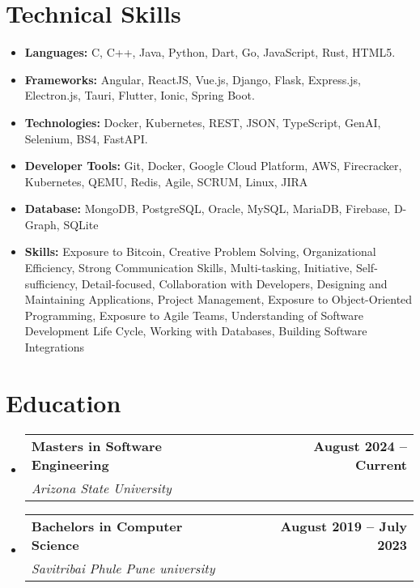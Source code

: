 \documentclass[letterpaper,11pt]{article}
\makeatletter
\newcommand{\resumeItem}[1]{
  \item\small{
    {#1 \vspace{-2pt}}
  }
}
\newcommand{\resumeSubheading}[4]{
  \vspace{-2pt}\item
    \begin{tabular*}{0.97\textwidth}[t]{l@{\extracolsep{\fill}}r}
      \textbf{\small#1} & \textbf{\small#2} \\
      \textit{\small#3} & \textit{\small#4} \\
    \end{tabular*}\vspace{-7pt}
}
\newcommand{\resumeSubItem}[1]{\resumeItem{#1}\vspace{-4pt}}
\newcommand{\resumeSubHeadingListStart}{\begin{itemize}[leftmargin=0.15in, label={}]}
\newcommand{\resumeSubHeadingListEnd}{\end{itemize}}
\makeatother
\begin{document}
\section{Technical Skills}
\resumeSubHeadingListStart
  \resumeSubItem{\textbf{Languages:} C, C++, Java, Python, Dart, Go, JavaScript, Rust, HTML5.}
  \resumeSubItem{\textbf{Frameworks:} Angular, ReactJS, Vue.js, Django, Flask, Express.js, Electron.js, Tauri, Flutter, Ionic, Spring Boot.}
  \resumeSubItem{\textbf{Technologies:} Docker, Kubernetes, REST, JSON, TypeScript, GenAI, Selenium, BS4, FastAPI.}
  \resumeSubItem{\textbf{Developer Tools:} Git, Docker, Google Cloud Platform, AWS, Firecracker, Kubernetes, QEMU, Redis, Agile, SCRUM, Linux, JIRA}
  \resumeSubItem{\textbf{Database:} MongoDB, PostgreSQL, Oracle, MySQL, MariaDB, Firebase, D-Graph, SQLite}
  \resumeSubItem{\textbf{Skills:} Exposure to Bitcoin, Creative Problem Solving, Organizational Efficiency, Strong Communication Skills, Multi-tasking, Initiative, Self-sufficiency, Detail-focused, Collaboration with Developers, Designing and Maintaining Applications, Project Management, Exposure to Object-Oriented Programming, Exposure to Agile Teams, Understanding of Software Development Life Cycle, Working with Databases, Building Software Integrations}
\resumeSubHeadingListEnd

\section{Education}
  \resumeSubHeadingListStart
    \resumeSubheading
      {Masters in Software Engineering}{August 2024 -- Current}
      {Arizona State University}{}
    \resumeSubheading
      {Bachelors in Computer Science}{August 2019 -- July 2023}
      {Savitribai Phule Pune university}{}
  \resumeSubHeadingListEnd
\end{document}

